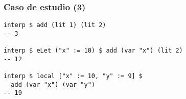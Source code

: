 \documentclass{beamer}
\begin{document}
\begin{frame}[fragile]
\frametitle{Caso de estudio (3)}

\begin{example}
\begin{verbatim}
interp $ add (lit 1) (lit 2)
-- 3

interp $ eLet ("x" := 10) $ add (var "x") (lit 2)
-- 12

interp $ local ["x" := 10, "y" := 9] $ 
  add (var "x") (var "y")
-- 19
\end{verbatim}
\end{example}

\end{frame}
\end{document}
